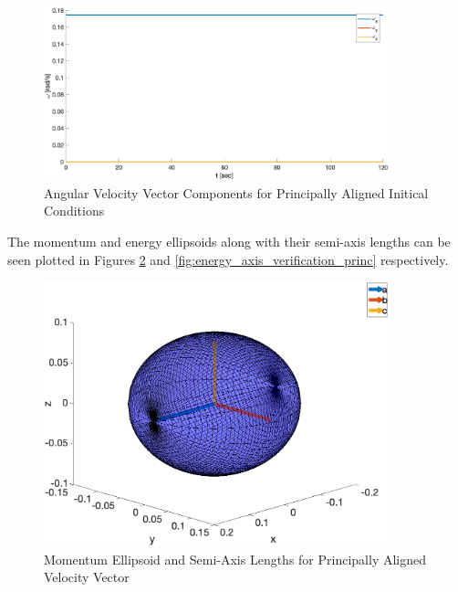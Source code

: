 \begin{figure}[H]
    \centering
    \captionsetup{justification = centering}
    \includegraphics[width = 10cm]{Images/omega_prop_principal.png}
    \caption{Angular Velocity Vector Components for Principally Aligned Initical Conditions}
    \label{fig:sim_omegas_principal}
\end{figure}

The momentum and energy ellipsoids along with their semi-axis lengths can be seen plotted in Figures \ref{fig:momentum_axis_verification_princ} and \ref{fig:energy_axis_verification_princ} respectively.

\begin{figure}[H]
    \centering
    \captionsetup{justification = centering}
    \includegraphics[width = 10cm]{Images/momentum_axes_principal.png}
    \caption{Momentum Ellipsoid and Semi-Axis Lengths for Principally Aligned Velocity Vector}
    \label{fig:momentum_axis_verification_princ}
\end{figure}

